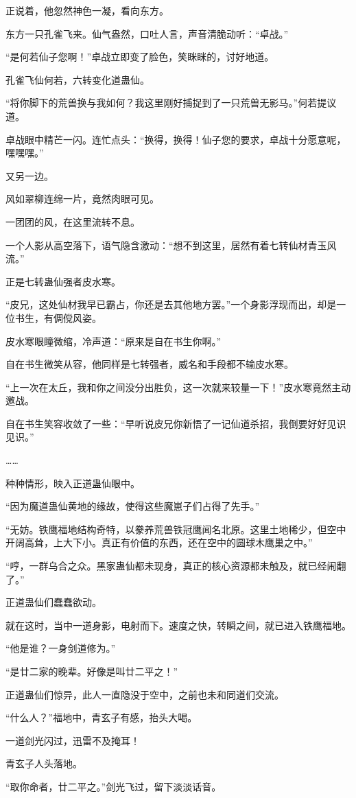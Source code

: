 \begin{this_body}
正说着，他忽然神色一凝，看向东方。

东方一只孔雀飞来。仙气盎然，口吐人言，声音清脆动听：“卓战。”

“是何若仙子您啊！”卓战立即变了脸色，笑眯眯的，讨好地道。

孔雀飞仙何若，六转变化道蛊仙。

“将你脚下的荒兽换与我如何？我这里刚好捕捉到了一只荒兽无影马。”何若提议道。

卓战眼中精芒一闪。连忙点头：“换得，换得！仙子您的要求，卓战十分愿意呢，嘿嘿嘿。”

又另一边。

风如翠柳连绵一片，竟然肉眼可见。

一团团的风，在这里流转不息。

一个人影从高空落下，语气隐含激动：“想不到这里，居然有着七转仙材青玉风流。”

正是七转蛊仙强者皮水寒。

“皮兄，这处仙材我早已霸占，你还是去其他地方罢。”一个身影浮现而出，却是一位书生，有倜傥风姿。

皮水寒眼瞳微缩，冷声道：“原来是自在书生你啊。”

自在书生微笑从容，他同样是七转强者，威名和手段都不输皮水寒。

“上一次在太丘，我和你之间没分出胜负，这一次就来较量一下！”皮水寒竟然主动邀战。

自在书生笑容收敛了一些：“早听说皮兄你新悟了一记仙道杀招，我倒要好好见识见识。”

……

种种情形，映入正道蛊仙眼中。

“因为魔道蛊仙黄地的缘故，使得这些魔崽子们占得了先手。”

“无妨。铁鹰福地结构奇特，以豢养荒兽铁冠鹰闻名北原。这里土地稀少，但空中开阔高耸，上大下小。真正有价值的东西，还在空中的圆球木鹰巢之中。”

“哼，一群乌合之众。黑家蛊仙都未现身，真正的核心资源都未触及，就已经闹翻了。”

正道蛊仙们蠢蠢欲动。

就在这时，当中一道身影，电射而下。速度之快，转瞬之间，就已进入铁鹰福地。

“他是谁？一身剑道修为。”

“是廿二家的晚辈。好像是叫廿二平之！”

正道蛊仙们惊异，此人一直隐没于空中，之前也未和同道们交流。

“什么人？”福地中，青玄子有感，抬头大喝。

一道剑光闪过，迅雷不及掩耳！

青玄子人头落地。

“取你命者，廿二平之。”剑光飞过，留下淡淡话音。

\end{this_body}

